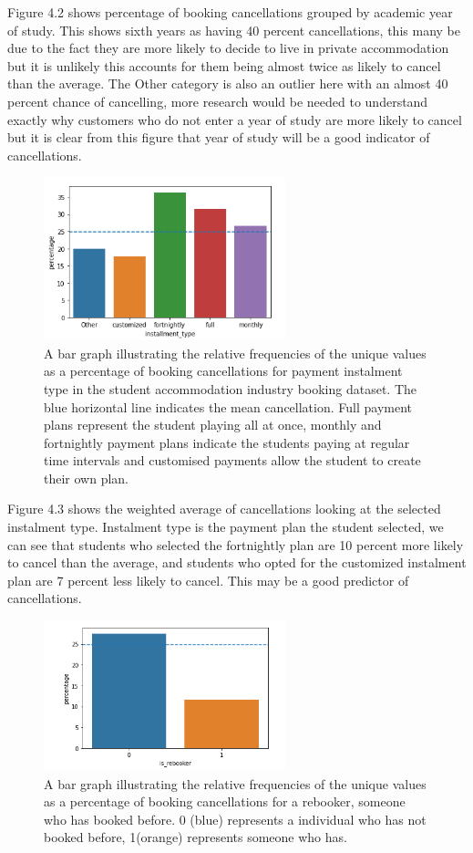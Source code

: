 Figure 4.2 shows percentage of booking cancellations grouped by academic year of study. This shows sixth years as having 40 percent cancellations, this many be due to the fact they are more likely to decide to live in private accommodation but it is unlikely this accounts for them being almost twice as likely to cancel than the average. The Other category is also an outlier here with an almost 40 percent chance of cancelling, more research would be needed to understand exactly why customers who do not enter a year of study are more likely to cancel but it is clear from this figure that year of study will be a good indicator of cancellations.

\vspace{5mm}
  
  \begin{figure}[H]
 \centering
\includegraphics[width=7cm]{figures/instalment_type.png}
 \caption{A bar graph illustrating the relative frequencies of the unique values as a percentage of booking cancellations for payment instalment type in the student accommodation industry booking dataset. The blue horizontal line indicates the mean cancellation. Full payment plans represent the student playing all at once, monthly and fortnightly payment plans indicate the students paying at regular time intervals and customised payments allow the student to create their own plan. }
\end{figure}
  
  
 Figure 4.3 shows the weighted average of cancellations looking at the selected instalment type. Instalment type is the payment plan the student selected, we can see that students who selected the fortnightly plan are 10 percent more likely to cancel than the average, and students who opted for the customized instalment plan are 7 percent less likely to cancel. This may be a good predictor of cancellations.
  
  
   \begin{figure}[H]
 \centering
\includegraphics[width=7cm]{figures/is_rebooker.png}
 \caption{A bar graph illustrating the relative frequencies of the unique values as a percentage of booking cancellations for a rebooker, someone who has booked before. 0 (blue) represents a individual who has not booked before, 1(orange) represents someone who has.}
\end{figure}
  

